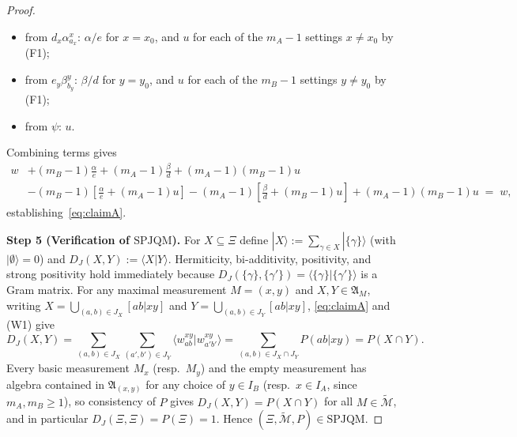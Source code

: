 \documentclass[11pt,a4paper]{article}
\theoremstyle{definition}
\theoremstyle{remark}
\newcommand{\tcM}{\widetilde{\mathcal{M}}}
\newcommand{\EA}{\mathfrak{A}}
\newcommand{\SPJQM}{\mathrm{SPJQM}}
\newcommand{\ket}[1]{|#1\rangle}
\newcommand{\braket}[2]{\langle #1 | #2 \rangle}
\begin{document}
\begin{proof}
\begin{itemize}[leftmargin=*,nosep]
\item from $d_x \alpha^x_{a_x}$: $\alpha/e$ for $x = x_0$, and $u$ for each of the $m_A - 1$ settings $x \neq x_0$ by (F1);
\item from $e_y \beta^y_{b_y}$: $\beta/d$ for $y = y_0$, and $u$ for each of the $m_B - 1$ settings $y \neq y_0$ by (F1);
\item from $\psi$: $u$.
\end{itemize}
Combining terms gives
\begin{align*}
w &+ (m_B-1)\frac{\alpha}{e} + (m_A-1)\frac{\beta}{d} + (m_A-1)(m_B-1)u \\
  &- (m_B-1)\!\left[\frac{\alpha}{e} + (m_A-1)u\right]
   - (m_A-1)\!\left[\frac{\beta}{d} + (m_B-1)u\right]
   + (m_A-1)(m_B-1)u \;=\; w,
\end{align*}
establishing~\eqref{eq:claimA}.

\medskip\noindent\textbf{Step 5 (Verification of $\SPJQM$).} For $X \subseteq \Xi$ define $\ket{X} := \sum_{\gamma \in X}\ket{\{\gamma\}}$ (with $\ket{\emptyset}=0$) and $D_J(X,Y) := \braket{X}{Y}$. Hermiticity, bi-additivity, positivity, and strong positivity hold immediately because $D_J(\{\gamma\},\{\gamma'\}) = \braket{\{\gamma\}}{\{\gamma'\}}$ is a Gram matrix. For any maximal measurement $M = (x,y)$ and $X, Y \in \EA_M$, writing $X = \bigcup_{(a,b) \in J_X} [ab|xy]$ and $Y = \bigcup_{(a,b) \in J_Y} [ab|xy]$, \eqref{eq:claimA} and (W1) give
\[
D_J(X, Y) = \sum_{(a,b) \in J_X}\sum_{(a',b') \in J_Y} \braket{w^{xy}_{ab}}{w^{xy}_{a'b'}}
= \sum_{(a,b) \in J_X \cap J_Y} P(ab|xy) = P(X \cap Y).
\]
Every basic measurement $M_x$ (resp.\ $M_y$) and the empty measurement has algebra contained in $\EA_{(x,y)}$ for any choice of $y \in I_B$ (resp.\ $x \in I_A$, since $m_A, m_B \ge 1$), so consistency of $P$ gives $D_J(X,Y) = P(X \cap Y)$ for all $M \in \tcM$, and in particular $D_J(\Xi,\Xi) = P(\Xi) = 1$. Hence $(\Xi,\tcM,P) \in \SPJQM$.
\end{proof}
\end{document}
